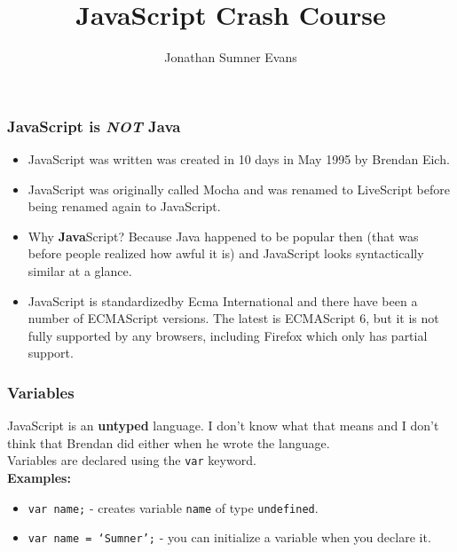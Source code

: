 \documentclass{lug}
\title{JavaScript Crash Course}
\author{Jonathan Sumner Evans}
\begin{document}
\begin{frame}
    \frametitle{JavaScript is \textbf{\textit{NOT}} Java \footnotemark[1]}

    \begin{itemize}[<+->]
        \item JavaScript was written was created in 10 days in May 1995 by Brendan Eich.
        \item JavaScript was originally called Mocha and was renamed to LiveScript before being
            renamed again to JavaScript.
        \item Why \textbf{Java}Script? Because Java happened to be popular then (that was before
            people realized how awful it is) and JavaScript looks syntactically similar at a glance.
        \item JavaScript is standardized\footnotemark[2] by Ecma International and there have been a
            number of ECMAScript versions. The latest is ECMAScript 6, but it is not fully supported
            by any browsers, including Firefox which only has partial support.
    \end{itemize}

\end{frame}


\begin{frame}
    \frametitle{Variables}

    JavaScript is an \textbf{untyped} language. I don't know what that means and I don't
    think that Brendan did either when he wrote the language.\\

    Variables are declared using the \texttt{var} keyword\footnotemark[1]. \\

    \textbf{Examples:}

    \begin{itemize}
        \item \texttt{var name;} - creates variable \texttt{name} of type \texttt{undefined}.
        \item \texttt{var name = `Sumner';} - you can initialize a variable when you declare it.
    \end{itemize}

\end{frame}
\end{document}
